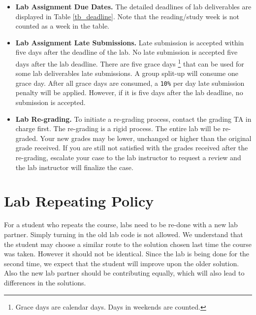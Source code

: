     \begin{itemize}
    \item {\bf Lab Assignment Due Dates.}
        The detailed deadlines of lab deliverables 
        are displayed in Table \ref{tb_deadline}. Note that the reading/study week is not counted as a week in the table. 
        
    \item {\bf Lab Assignment Late Submissions.} 
    	Late submission is accepted within five days after the deadline of the lab. 
    	No late submission is accepted five days after the lab deadline.
    	There are five grace days \footnote{Grace days are calendar days. Days in weekends are counted.}
        that can be used for some lab deliverables late submissions.
        A group split-up will consume one grace day. 
        After all grace days are consumed, a \verb+10%+ per day late submission penalty will be applied.
        However, if it is five days after the lab deadline, no submission is accepted. 
        
    \item {\bf Lab Re-grading.}
    	To initiate a re-grading process, contact the grading TA in charge first. The re-grading is a rigid process. The entire lab will be re-graded. Your new grades may be lower, unchanged or higher than the original grade received. If you are still not satisfied with the grades received after the re-grading, escalate your case to the lab instructor to request a review and the lab instructor will finalize the case.
    \end{itemize}
\section*{Lab Repeating Policy}
For a student who repeats the course, labs need to be re-done with a new lab partner. 
Simply turning in the old lab code is not allowed. 
We understand that the student may choose a similar route to the solution chosen last time 
the course was taken. However it should not be identical. Since the lab is being done for the second time,
we expect that the student will improve upon the older solution. Also the new lab partner should be 
contributing equally, which will also lead to differences in the solutions. 

